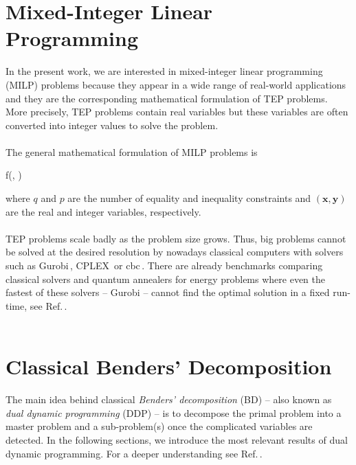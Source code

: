 \section{Mixed-Integer Linear Programming}
In the present work, we are interested in mixed-integer linear programming (MILP) problems because they appear in a wide range of real-world applications and they are the corresponding mathematical formulation of TEP problems. More precisely, TEP problems contain real variables but these variables are often converted into integer values to solve the problem.\\\\
The general mathematical formulation of MILP problems is
\begin{mini!}[2]
	{}{f(, )}{\label{eq: MILP}}{}{}
\end{mini!}
where $q$ and $p$ are the number of equality and inequality constraints and $(\mathbf{x},\mathbf{y})$ are the real and integer variables, respectively.\\\\
TEP problems scale badly as the problem size grows. Thus, big problems cannot be solved at the desired resolution by nowadays classical computers with solvers such as Gurobi\,\cite{gurobi}, CPLEX\,\cite{cplex2009v12} or cbc\,\cite{cbc}. There are already benchmarks comparing classical solvers and quantum annealers for energy problems where even the fastest of these solvers -- Gurobi -- cannot find the optimal solution in a fixed run-time, see Ref.\,\cite{Fernandez-Campoamor2021CommunityAnnealing}. \\\\
\section{Classical Benders' Decomposition}
The main idea behind classical \textit{Benders' decomposition} (BD) -- also known as \textit{dual dynamic programming} (DDP) -- is to decompose the primal problem into a master problem and a sub-problem(s) once the complicated variables are detected. In the following sections, we introduce the most relevant results of dual dynamic programming. For a deeper understanding see Ref.\,\cite{bierlaire2018}.
